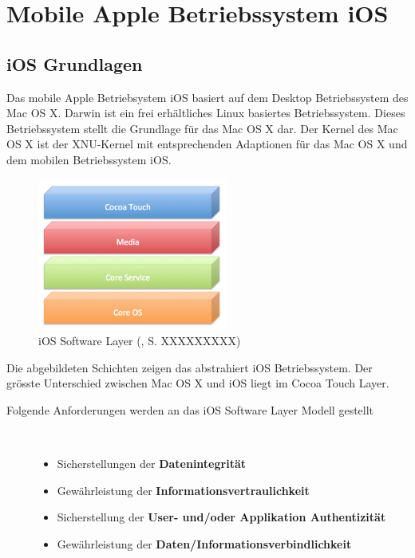 %
%
% 
% 
% 
\chapter{Mobile Apple Betriebssystem iOS}
\label{ch:iOS}
\section{iOS Grundlagen}
\label{sec:iOSGrundlage}

Das mobile Apple Betriebsystem iOS basiert auf dem Desktop Betriebssystem des Mac OS X. Darwin ist ein frei erhältliches Linux basiertes Betriebssystem. Dieses Betriebssystem stellt die Grundlage für das Mac OS X dar. Der Kernel des Mac OS X ist der XNU-Kernel mit entsprechenden Adaptionen für das Mac OS X und dem mobilen Betriebssystem iOS.
\begin{figure}[htbp]
        \centering
                \includegraphics[height=5cm]{Bilder/Chapter3_SystemArchitektur}
        \caption{iOS Software Layer (\cite{Apple[6]}, S. XXXXXXXXX)}
        	\label{fig:iOS Software Layer}
\end{figure}
Die abgebildeten Schichten zeigen das abstrahiert iOS Betriebssystem. Der grösste Unterschied zwischen Mac OS X und iOS liegt im Cocoa Touch Layer.
  
\begin{description}
\item[Folgende Anforderungen werden an das iOS Software Layer Modell gestellt]~\par
	\begin{itemize}
		\item Sicherstellungen der \textbf{Datenintegrität}
		\item Gewährleistung der \textbf{Informationsvertraulichkeit}
		\item Sicherstellung der \textbf{User- und/oder Applikation Authentizität}
		\item Gewährleistung der \textbf{Daten/Informationsverbindlichkeit}
	\end{itemize}
\end{description}

